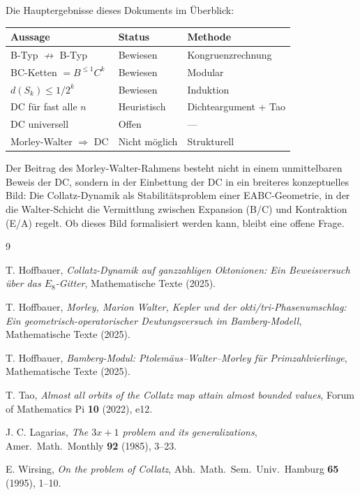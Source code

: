 \documentclass[12pt,a4paper]{article}
\begin{document}
Die Hauptergebnisse dieses Dokuments im Überblick:

\begin{center}
\renewcommand{\arraystretch}{1.4}
\begin{tabular}{p{5.5cm} p{3.5cm} p{4.5cm}}
\toprule
\textbf{Aussage} & \textbf{Status} & \textbf{Methode} \\
\midrule
B-Typ $\nrightarrow$ B-Typ & Bewiesen & Kongruenzrechnung \\
BC-Ketten $= B^{\leq 1} C^k$ & Bewiesen & Modular \\
$d(S_k) \leq 1/2^k$ & Bewiesen & Induktion \\
DC für fast alle $n$ & Heuristisch & Dichteargument + Tao \\
DC universell & Offen & --- \\
Morley-Walter $\Rightarrow$ DC & Nicht möglich & Strukturell \\
\bottomrule
\end{tabular}
\end{center}

\bigskip

Der Beitrag des Morley-Walter-Rahmens besteht nicht in einem
unmittelbaren Beweis der DC, sondern in der Einbettung der DC
in ein breiteres konzeptuelles Bild: Die Collatz-Dynamik als
Stabilitätsproblem einer EABC-Geometrie, in der die Walter-Schicht
die Vermittlung zwischen Expansion (B/C) und Kontraktion (E/A) regelt.
Ob dieses Bild formalisiert werden kann, bleibt eine offene Frage.

\begin{thebibliography}{9}

T. Hoffbauer,
\textit{Collatz-Dynamik auf ganzzahligen Oktonionen: Ein Beweisversuch
über das $E_8$-Gitter},
Mathematische Texte (2025).

T. Hoffbauer,
\textit{Morley, Marion Walter, Kepler und der okti/tri-Phasenumschlag:
Ein geometrisch-operatorischer Deutungsversuch im Bamberg-Modell},
Mathematische Texte (2025).

T. Hoffbauer,
\textit{Bamberg-Modul: Ptolemäus--Walter--Morley für Primzahlvierlinge},
Mathematische Texte (2025).

T. Tao,
\textit{Almost all orbits of the Collatz map attain almost bounded values},
Forum of Mathematics Pi \textbf{10} (2022), e12.

J. C. Lagarias,
\textit{The $3x+1$ problem and its generalizations},
Amer.\ Math.\ Monthly \textbf{92} (1985), 3--23.

E. Wirsing,
\textit{On the problem of Collatz},
Abh.\ Math.\ Sem.\ Univ.\ Hamburg \textbf{65} (1995), 1--10.

\end{thebibliography}
\end{document}
